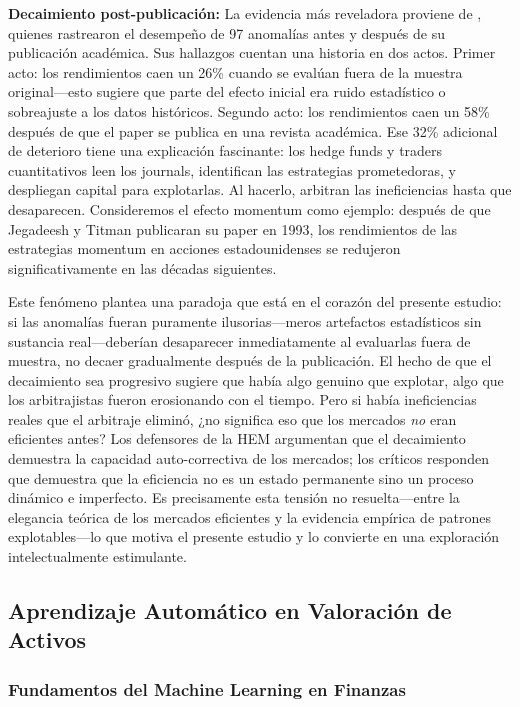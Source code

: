 \documentclass[11pt,a4paper]{article}
\begin{document}
\textbf{Decaimiento post-publicación:} La evidencia más reveladora proviene de \citet{mclean2016}, quienes rastrearon el desempeño de 97 anomalías antes y después de su publicación académica. Sus hallazgos cuentan una historia en dos actos. Primer acto: los rendimientos caen un 26\% cuando se evalúan fuera de la muestra original---esto sugiere que parte del efecto inicial era ruido estadístico o sobreajuste a los datos históricos. Segundo acto: los rendimientos caen un 58\% después de que el paper se publica en una revista académica. Ese 32\% adicional de deterioro tiene una explicación fascinante: los hedge funds y traders cuantitativos leen los journals, identifican las estrategias prometedoras, y despliegan capital para explotarlas. Al hacerlo, arbitran las ineficiencias hasta que desaparecen. Consideremos el efecto momentum como ejemplo: después de que Jegadeesh y Titman publicaran su paper en 1993, los rendimientos de las estrategias momentum en acciones estadounidenses se redujeron significativamente en las décadas siguientes.

Este fenómeno plantea una paradoja que está en el corazón del presente estudio: si las anomalías fueran puramente ilusorias---meros artefactos estadísticos sin sustancia real---deberían desaparecer inmediatamente al evaluarlas fuera de muestra, no decaer gradualmente después de la publicación. El hecho de que el decaimiento sea progresivo sugiere que había algo genuino que explotar, algo que los arbitrajistas fueron erosionando con el tiempo. Pero si había ineficiencias reales que el arbitraje eliminó, ¿no significa eso que los mercados \textit{no} eran eficientes antes? Los defensores de la HEM argumentan que el decaimiento demuestra la capacidad auto-correctiva de los mercados; los críticos responden que demuestra que la eficiencia no es un estado permanente sino un proceso dinámico e imperfecto. Es precisamente esta tensión no resuelta---entre la elegancia teórica de los mercados eficientes y la evidencia empírica de patrones explotables---lo que motiva el presente estudio y lo convierte en una exploración intelectualmente estimulante.

\subsection{Aprendizaje Automático en Valoración de Activos}

\subsubsection{Fundamentos del Machine Learning en Finanzas}
\end{document}
